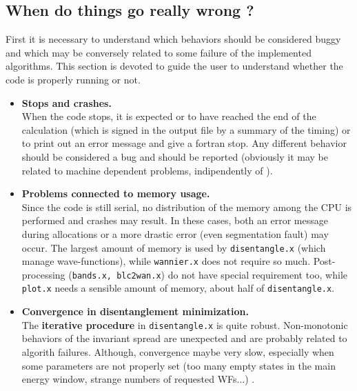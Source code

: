 \subsection{When do things go really wrong ?}
First it is necessary to understand which behaviors should be considered buggy and 
which may be conversely related to some failure of the implemented algorithms.
This section is devoted to guide the user to understand whether the code is
properly running or not. \\
%
%
\begin{itemize}
\item   {\bf Stops and crashes.} \\
        When the code stops, it is expected or to have reached the end
        of the calculation (which is signed in the output file by a summary
        of the timing) or to print
        out an error message and give a fortran stop. Any different behavior
        should be considered a bug and should be reported 
        (obviously it may be related to machine dependent problems, 
        indipendently of \WANT).

\item   {\bf Problems connected to memory usage.} \\
        Since the code is still serial, no distribution of the memory among the
        CPU is performed and crashes may result. In these cases, both an
        error message during allocations or a more drastic error (even segmentation
        fault) may occur. The largest amount of memory is used by 
        {\tt disentangle.x} (which manage wave-functions), while {\tt wannier.x} 
        does not require so much. Post-processing ({\tt bands.x, blc2wan.x}) 
        do not have special requirement too, while {\tt plot.x} needs a sensible
        amount of memory, about half of {\tt disentangle.x}.
       
\item   {\bf Convergence in disentanglement minimization.} \\
        The {\bf iterative procedure} in {\tt disentangle.x} is quite robust. 
        Non-monotonic behaviors of the invariant spread are unexpected
        and are probably related to algorith failures. Although, convergence
        maybe very slow, especially when some parameters are not properly set
        (too many empty states in the main energy window, strange numbers of 
        requested WFs...) .


\end{itemize}
